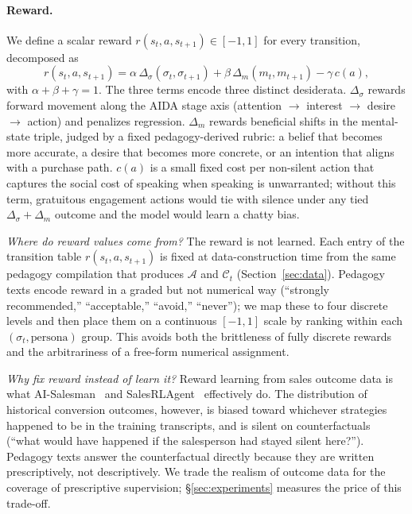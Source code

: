\documentclass{article}
\begin{document}
\paragraph{Reward.}
We define a scalar reward $r(s_t, a, s_{t+1}) \in [-1, 1]$ for every transition, decomposed as
\[
r(s_t, a, s_{t+1}) = \alpha\, \Delta_\sigma(\sigma_t, \sigma_{t+1}) + \beta\, \Delta_m(m_t, m_{t+1}) - \gamma\, c(a),
\]
with $\alpha + \beta + \gamma = 1$. The three terms encode three distinct desiderata. $\Delta_\sigma$ rewards forward movement along the AIDA stage axis (attention $\to$ interest $\to$ desire $\to$ action) and penalizes regression. $\Delta_m$ rewards beneficial shifts in the mental-state triple, judged by a fixed pedagogy-derived rubric: a belief that becomes more accurate, a desire that becomes more concrete, or an intention that aligns with a purchase path. $c(a)$ is a small fixed cost per non-silent action that captures the social cost of speaking when speaking is unwarranted; without this term, gratuitous engagement actions would tie with silence under any tied $\Delta_\sigma + \Delta_m$ outcome and the model would learn a chatty bias.

\textit{Where do reward values come from?} The reward is not learned. Each entry of the transition table $r(s_t, a, s_{t+1})$ is fixed at data-construction time from the same pedagogy compilation that produces $\mathcal{A}$ and $\mathcal{C}_t$ (Section~\ref{sec:data}). Pedagogy texts encode reward in a graded but not numerical way (``strongly recommended,'' ``acceptable,'' ``avoid,'' ``never''); we map these to four discrete levels and then place them on a continuous $[-1, 1]$ scale by ranking within each $(\sigma_t, \text{persona})$ group. This avoids both the brittleness of fully discrete rewards and the arbitrariness of a free-form numerical assignment.

\textit{Why fix reward instead of learn it?} Reward learning from sales outcome data is what AI-Salesman~\cite{AISalesman} and SalesRLAgent~\cite{SalesRLAgent} effectively do. The distribution of historical conversion outcomes, however, is biased toward whichever strategies happened to be in the training transcripts, and is silent on counterfactuals (``what would have happened if the salesperson had stayed silent here?''). Pedagogy texts answer the counterfactual directly because they are written prescriptively, not descriptively. We trade the realism of outcome data for the coverage of prescriptive supervision; §\ref{sec:experiments} measures the price of this trade-off.
\end{document}
